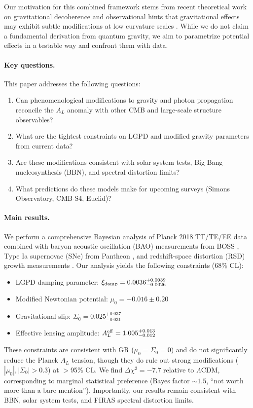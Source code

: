 Our motivation for this combined framework stems from recent theoretical work on gravitational decoherence \citep{Blencowe2013,Pikovski2015_universal,Bassi2013_models} and observational hints that gravitational effects may exhibit subtle modifications at low curvature scales \citep{Burrage2018_tests,Koyama2016_cosmotests}. While we do not claim a fundamental derivation from quantum gravity, we aim to parametrize potential effects in a testable way and confront them with data.

\paragraph{Key questions.}
This paper addresses the following questions:
\begin{enumerate}
\item Can phenomenological modifications to gravity and photon propagation reconcile the $A_L$ anomaly with other CMB and large-scale structure observables?
\item What are the tightest constraints on LGPD and modified gravity parameters from current data?
\item Are these modifications consistent with solar system tests, Big Bang nucleosynthesis (BBN), and spectral distortion limits?
\item What predictions do these models make for upcoming surveys (Simons Observatory, CMB-S4, Euclid)?
\end{enumerate}

\paragraph{Main results.}
We perform a comprehensive Bayesian analysis of Planck 2018 TT/TE/EE data combined with baryon acoustic oscillation (BAO) measurements from BOSS \citep{Alam2017_BOSS}, Type Ia supernovae (SNe) from Pantheon \citep{Scolnic2018_Pantheon}, and redshift-space distortion (RSD) growth measurements \citep{Gil-Marin2020_eBOSS}. Our analysis yields the following constraints (68\% CL):
\begin{itemize}
\item LGPD damping parameter: $\xi_{\rm damp} = 0.0036^{+0.0039}_{-0.0026}$
\item Modified Newtonian potential: $\mu_0 = -0.016 \pm 0.20$
\item Gravitational slip: $\Sigma_0 = 0.025^{+0.037}_{-0.031}$
\item Effective lensing amplitude: $A_L^{\rm eff} = 1.005^{+0.013}_{-0.012}$
\end{itemize}
These constraints are consistent with GR ($\mu_0 = \Sigma_0 = 0$) and do not significantly reduce the Planck $A_L$ tension, though they do rule out strong modifications ($|\mu_0|, |\Sigma_0| > 0.3$) at $>$95\% CL. We find $\Delta\chi^2 = -7.7$ relative to $\Lambda$CDM, corresponding to marginal statistical preference (Bayes factor $\sim 1.5$, ``not worth more than a bare mention''). Importantly, our results remain consistent with BBN, solar system tests, and FIRAS spectral distortion limits.

